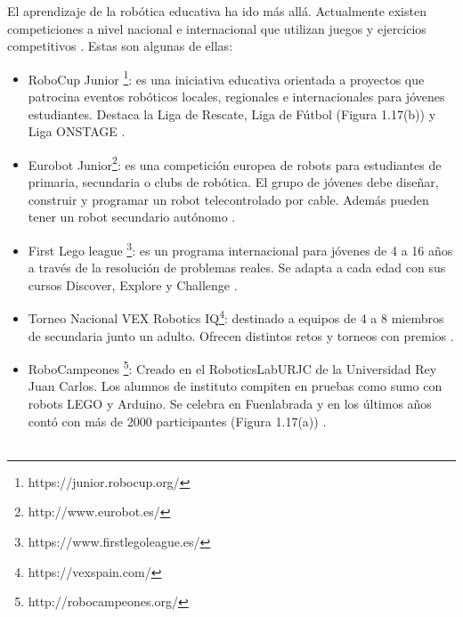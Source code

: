 El aprendizaje de la robótica educativa ha ido más allá. Actualmente existen competiciones a nivel nacional e internacional que utilizan juegos y ejercicios competitivos \cite{competiciones}. Estas son algunas de ellas:
\begin{itemize}
    \item RoboCup Junior \footnote{https://junior.robocup.org/}: es una iniciativa educativa orientada a proyectos que patrocina eventos robóticos locales, regionales e internacionales para jóvenes estudiantes. Destaca la Liga de Rescate, Liga de Fútbol (Figura 1.17(b)) y Liga ONSTAGE \cite{robocup}.
 
    \item Eurobot Junior\footnote{http://www.eurobot.es/}: es una competición europea de robots para estudiantes de primaria, secundaria o clubs de robótica. El grupo de jóvenes debe diseñar, construir y programar un robot telecontrolado por cable. Además pueden tener un robot secundario autónomo  \cite{eurobot}.
    
    \item First Lego league \footnote{https://www.firstlegoleague.es/}: es un programa internacional  para jóvenes de 4 a 16 años a través de la resolución de problemas reales. Se adapta a cada edad con sus cursos Discover, Explore y Challenge \cite{firstlego}.
    
    \item Torneo Nacional VEX Robotics IQ\footnote{https://vexspain.com/}: destinado a equipos de 4 a 8 miembros de secundaria junto un adulto. Ofrecen distintos retos y torneos con premios \cite{vex}.
    
    \item RoboCampeones \footnote{http://robocampeones.org/}: Creado en el RoboticsLabURJC de la Universidad Rey Juan Carlos. Los alumnos de instituto compiten en pruebas como sumo con robots LEGO y Arduino. Se celebra en Fuenlabrada y en los últimos años contó con más de 2000 participantes (Figura 1.17(a)) \cite{robocampeones}.
    \\
    \\
    

\end{itemize}
